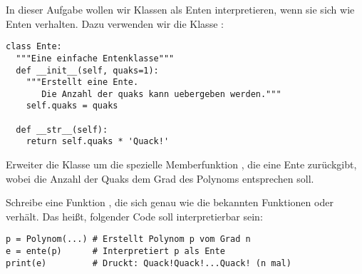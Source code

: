 \begin{aufg}
  In dieser Aufgabe wollen wir Klassen als Enten interpretieren, wenn sie sich wie Enten verhalten.
  Dazu verwenden wir die Klasse :
  \begin{lstlisting}
class Ente:
  """Eine einfache Entenklasse"""
  def __init__(self, quaks=1):
    """Erstellt eine Ente.
       Die Anzahl der quaks kann uebergeben werden."""
    self.quaks = quaks
  
  def __str__(self):
    return self.quaks * 'Quack!'
  \end{lstlisting}
  
  Erweiter die Klasse  um die spezielle Memberfunktion ,
  die eine Ente zurückgibt, wobei die Anzahl der Quaks dem Grad des Polynoms entsprechen soll.
  
  Schreibe eine Funktion , die sich genau wie die bekannten Funktionen  oder  verhält.
  Das heißt, folgender Code soll interpretierbar sein:
  \begin{lstlisting}
p = Polynom(...) # Erstellt Polynom p vom Grad n
e = ente(p)      # Interpretiert p als Ente
print(e)         # Druckt: Quack!Quack!...Quack! (n mal)
  \end{lstlisting}

\end{aufg}
